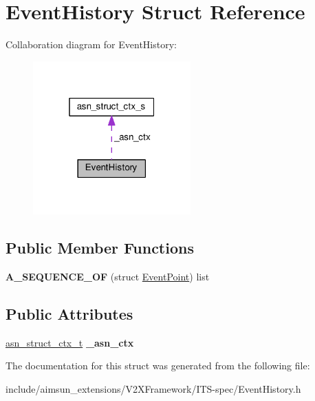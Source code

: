 \hypertarget{structEventHistory}{}\section{Event\+History Struct Reference}
\label{structEventHistory}


Collaboration diagram for Event\+History\+:\nopagebreak
\begin{figure}[H]
\begin{center}
\leavevmode
\includegraphics[width=172pt]{structEventHistory__coll__graph}
\end{center}
\end{figure}
\subsection*{Public Member Functions}
\begin{DoxyCompactItemize}
\item 
{\bfseries A\+\_\+\+S\+E\+Q\+U\+E\+N\+C\+E\+\_\+\+OF} (struct \hyperlink{structEventPoint}{Event\+Point}) list\hypertarget{structEventHistory_a4455c27926da6e304d209ca4f70de982}{}\label{structEventHistory_a4455c27926da6e304d209ca4f70de982}

\end{DoxyCompactItemize}
\subsection*{Public Attributes}
\begin{DoxyCompactItemize}
\item 
\hyperlink{structasn__struct__ctx__s}{asn\+\_\+struct\+\_\+ctx\+\_\+t} {\bfseries \+\_\+asn\+\_\+ctx}\hypertarget{structEventHistory_ab5597215f4a686d59a13856d9340cb85}{}\label{structEventHistory_ab5597215f4a686d59a13856d9340cb85}

\end{DoxyCompactItemize}


The documentation for this struct was generated from the following file\+:\begin{DoxyCompactItemize}
\item 
include/aimsun\+\_\+extensions/\+V2\+X\+Framework/\+I\+T\+S-\/spec/Event\+History.\+h\end{DoxyCompactItemize}
